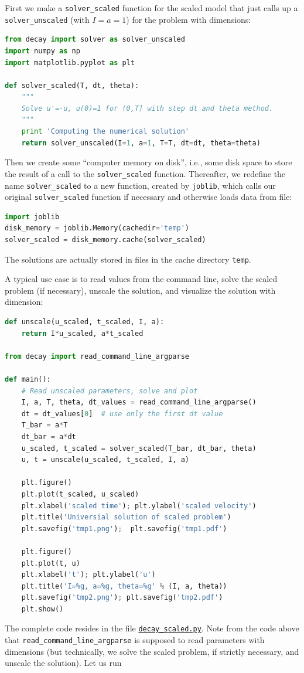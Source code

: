 \documentclass[graybox,envcountchap,sectrefs,final]{svmonodo}
\begin{document}
First we make a \Verb!solver_scaled! function for the scaled
model that just calls up a \Verb!solver_unscaled! (with $I=a=1$) for the problem with
dimensions:

\begin{lstlisting}[language=Python,style=graycolor]
from decay import solver as solver_unscaled
import numpy as np
import matplotlib.pyplot as plt

def solver_scaled(T, dt, theta):
    """
    Solve u'=-u, u(0)=1 for (0,T] with step dt and theta method.
    """
    print 'Computing the numerical solution'
    return solver_unscaled(I=1, a=1, T=T, dt=dt, theta=theta)
\end{lstlisting}
Then we create some ``computer memory on disk'', i.e., some disk space to
store the result of a call to the \Verb!solver_scaled! function. Thereafter,
we redefine the name \Verb!solver_scaled! to a new function, created
by \texttt{joblib}, which calls our original \Verb!solver_scaled! function
if necessary and otherwise loads data from file:

\begin{lstlisting}[language=Python,style=graycolor]
import joblib
disk_memory = joblib.Memory(cachedir='temp')
solver_scaled = disk_memory.cache(solver_scaled)
\end{lstlisting}
The solutions are actually stored in files in the cache directory \texttt{temp}.

A typical use case is to read values from the command line,
solve the scaled problem (if necessary), unscale the solution, and visualize
the solution with dimension:

\begin{lstlisting}[language=Python,style=graycolor]
def unscale(u_scaled, t_scaled, I, a):
    return I*u_scaled, a*t_scaled

from decay import read_command_line_argparse

def main():
    # Read unscaled parameters, solve and plot
    I, a, T, theta, dt_values = read_command_line_argparse()
    dt = dt_values[0]  # use only the first dt value
    T_bar = a*T
    dt_bar = a*dt
    u_scaled, t_scaled = solver_scaled(T_bar, dt_bar, theta)
    u, t = unscale(u_scaled, t_scaled, I, a)

    plt.figure()
    plt.plot(t_scaled, u_scaled)
    plt.xlabel('scaled time'); plt.ylabel('scaled velocity')
    plt.title('Universial solution of scaled problem')
    plt.savefig('tmp1.png');  plt.savefig('tmp1.pdf')

    plt.figure()
    plt.plot(t, u)
    plt.xlabel('t'); plt.ylabel('u')
    plt.title('I=%g, a=%g, theta=%g' % (I, a, theta))
    plt.savefig('tmp2.png'); plt.savefig('tmp2.pdf')
    plt.show()
\end{lstlisting}
The complete code resides in the file
\href{{http://tinyurl.com/o8pb3yy/decay_scaled.py}}{\nolinkurl{decay_scaled.py}}.
Note from the code above that \Verb!read_command_line_argparse! is supposed
to read parameters with dimensions (but technically, we solve the
scaled problem, if strictly necessary, and unscale the solution).
Let us run
\end{document}
